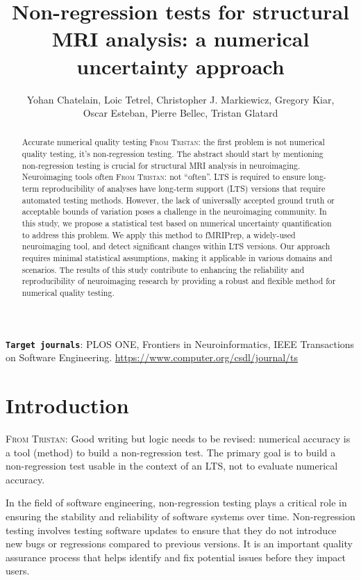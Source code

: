 \documentclass{article}
\title{Non-regression tests for structural MRI analysis: a numerical uncertainty approach}
\author{Yohan Chatelain, Loic Tetrel, Christopher J. Markiewicz, Gregory Kiar,\\ Oscar Esteban,  Pierre Bellec, Tristan Glatard}
\newcommand{\TG}[1]{\color{blue}\textsc{From Tristan:} #1\color{black}\xspace}
\newcommand{\fmriprep}{fMRIPrep\xspace}
\begin{document}
\maketitle

\begin{abstract}
    Accurate numerical quality testing \TG{the first problem is not numerical quality testing, it's non-regression testing. The abstract should start by mentioning non-regression testing}is
     crucial for structural MRI analysis in neuroimaging. Neuroimaging tools often \TG{not ``often''. LTS is required to ensure long-term reproducibility of analyses} have long-term support (LTS) versions that require automated testing methods. However, the lack of universally accepted ground truth or acceptable bounds of variation poses a challenge in the neuroimaging community. In this study, we propose a statistical test based on numerical uncertainty quantification to address this problem. We apply this method to \fmriprep, 
     a widely-used neuroimaging tool, and detect significant changes within LTS versions. Our approach requires minimal statistical assumptions, making it applicable in various domains and scenarios. The results of this study contribute to enhancing the reliability and reproducibility of neuroimaging research by providing a robust and flexible method for numerical quality testing.
\end{abstract}

{
\small
\textbf{\texttt{Target journals}}: PLOS ONE, Frontiers in Neuroinformatics,  IEEE Transactions on
Software Engineering. \url{https://www.computer.org/csdl/journal/ts}
}

\section{Introduction}

\TG{Good writing but logic needs to be revised: numerical accuracy is a tool (method) to build a non-regression test. The primary goal is to build a non-regression test usable in the context of an LTS, not to evaluate numerical accuracy.}

In the field of software engineering, non-regression testing plays a critical role in ensuring the stability and reliability of software systems over time. Non-regression testing involves testing software updates to ensure that they do not introduce new bugs or regressions compared to previous versions. It is an important quality assurance process that helps identify and fix potential issues before they impact users.
\end{document}

